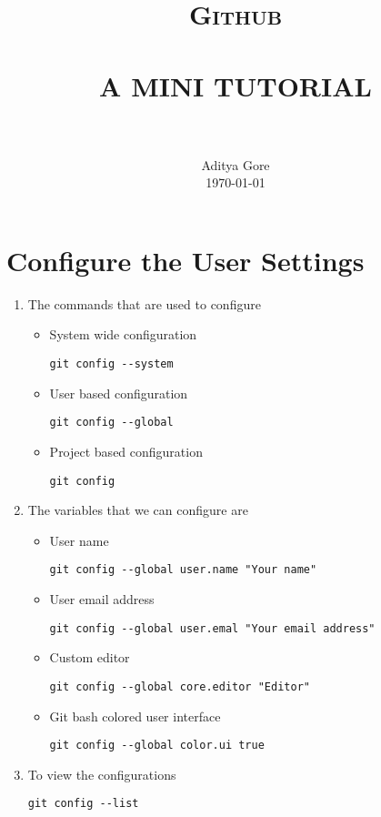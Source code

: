 \documentclass[paper=a4, fontsize=12pt]{scrartcl}
\title{
		\vspace{-1in} 	
		\usefont{OT1}{bch}{b}{n}
		\normalfont \normalsize \textsc{Github} \\ [25pt]
		\horrule{0.5pt} \\[0.4cm]
		\Large A MINI TUTORIAL \\
		\horrule{2pt} \\[0.5cm]
}
\author{
		\normalfont 								\normalsize
        Aditya Gore\\[-3pt]		\normalsize
        \today
}
\date{}
\begin{document}
\maketitle



\lstset{style=git}



\section*{Configure the User Settings}
\begin{enumerate}
\item The commands that are used to configure
\begin{itemize}
\item System wide configuration
\begin{lstlisting}
git config --system
\end{lstlisting}
\item User based configuration
\begin{lstlisting}
git config --global
\end{lstlisting}
\item Project based configuration
\begin{lstlisting}
git config
\end{lstlisting}
\end{itemize}
\item The variables that we can configure are
\begin{itemize}
\item User name
\begin{lstlisting}
git config --global user.name "Your name"
\end{lstlisting}
\item User email address
\begin{lstlisting}
git config --global user.emal "Your email address"
\end{lstlisting}
\item Custom editor
\begin{lstlisting}
git config --global core.editor "Editor"
\end{lstlisting}
\item Git bash colored user interface
\begin{lstlisting}
git config --global color.ui true
\end{lstlisting}
\end{itemize}
\item To view the configurations
\begin{lstlisting}
git config --list
\end{lstlisting}
\end{enumerate}
\end{document}
